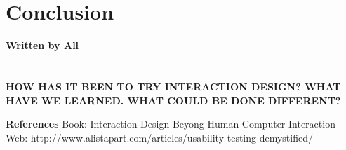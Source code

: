\chapter{Conclusion}
\textbf{Written by All}\\
\\ \\ \textbf{HOW HAS IT BEEN TO TRY INTERACTION DESIGN? WHAT HAVE WE LEARNED. WHAT COULD BE DONE DIFFERENT?}



\textbf{References}
Book: Interaction Design Beyong Human Computer Interaction\\
Web: http://www.alistapart.com/articles/usability-testing-demystified/\\